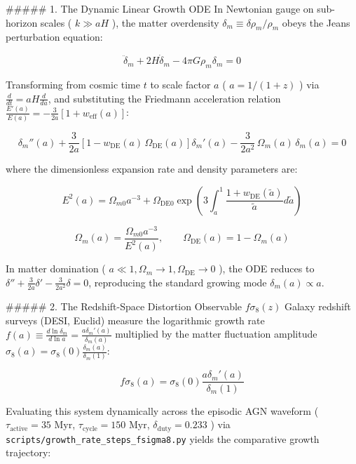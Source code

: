 \documentclass[11pt,a4paper]{article}
\theoremstyle{definition}
\theoremstyle{remark}
\begin{document}
\#\#\#\#\# 1. The Dynamic Linear Growth ODE
In Newtonian gauge on sub-horizon scales ( $k \gg aH$ ), the matter overdensity $\delta_m \equiv \delta\rho_m / \rho_m$ obeys the Jeans perturbation equation:


\begin{equation}
\ddot{\delta}_m + 2H\dot{\delta}_m - 4\pi G \rho_m \delta_m = 0
\end{equation}


Transforming from cosmic time $t$ to scale factor $a$ ( $a = 1/(1+z)$ ) via $\frac{d}{dt} = aH\frac{d}{da}$, and substituting the Friedmann acceleration relation $\frac{E'(a)}{E(a)} = -\frac{3}{2a}[1 + w_{\text{eff}}(a)]$:


\begin{equation}
\boxed{\delta_m''(a) + \frac{3}{2a}\left[ 1 - w_{\text{DE}}(a)\,\Omega_{\text{DE}}(a) \right] \delta_m'(a) - \frac{3}{2a^2}\,\Omega_m(a)\,\delta_m(a) = 0}
\end{equation}


where the dimensionless expansion rate and density parameters are:


\begin{equation}
E^2(a) = \Omega_{m0} a^{-3} + \Omega_{\text{DE}0} \exp\left( 3 \int_a^1 \frac{1 + w_{\text{DE}}(\tilde{a})}{\tilde{a}} d\tilde{a} \right)
\end{equation}



\begin{equation}
\Omega_m(a) = \frac{\Omega_{m0} a^{-3}}{E^2(a)}, \qquad \Omega_{\text{DE}}(a) = 1 - \Omega_m(a)
\end{equation}


In matter domination ( $a \ll 1, \Omega_m \to 1, \Omega_{\text{DE}} \to 0$ ), the ODE reduces to $\delta'' + \frac{3}{2a}\delta' - \frac{3}{2a^2}\delta = 0$, reproducing the standard growing mode $\delta_m(a) \propto a$.

\#\#\#\#\# 2. The Redshift-Space Distortion Observable $f\sigma_8(z)$
Galaxy redshift surveys (DESI, Euclid) measure the logarithmic growth rate $f(a) \equiv \frac{d\ln\delta_m}{d\ln a} = \frac{a \delta_m'(a)}{\delta_m(a)}$ multiplied by the matter fluctuation amplitude $\sigma_8(a) = \sigma_8(0) \frac{\delta_m(a)}{\delta_m(1)}$:


\begin{equation}
\boxed{f\sigma_8(a) = \sigma_8(0) \frac{a \delta_m'(a)}{\delta_m(1)}}
\end{equation}


Evaluating this system dynamically across the episodic AGN waveform ( $\tau_{\text{active}} = 35\text{ Myr}$, $\tau_{\text{cycle}} = 150\text{ Myr}$, $\delta_{\text{duty}} = 0.233$ ) via \texttt{scripts/growth_rate_steps_fsigma8.py} yields the comparative growth trajectory:
\end{document}
